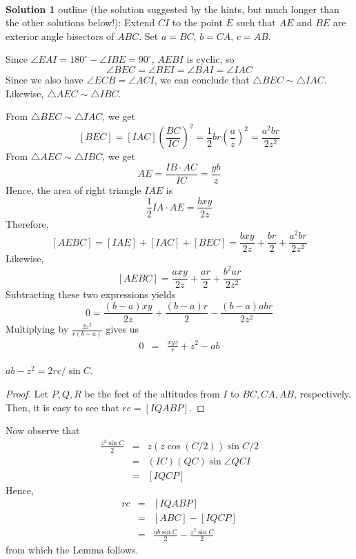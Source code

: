 \begin{mdsoln}
    \ \\
    \textbf{Solution 1} outline (the solution suggested by the hints, but much longer than the other solutions below!):
Extend $CI$ to the point $E$ such that $AE$ and $BE$ are exterior angle bisectors of $ABC$. Set $a = BC$, $b = CA$, $c = AB$.

Since $\angle EAI = 180^\circ - \angle IBE = 90^\circ$, $AEBI$ is cyclic, so
\[
\angle BEC = \angle BEI = \angle BAI = \angle IAC
\]Since we also have $\angle ECB = \angle ACI$, we can conclude that $\triangle BEC\sim \triangle IAC$. Likewise, $\triangle AEC\sim \triangle IBC$.

From $\triangle BEC\sim \triangle IAC$, we get
\[
[BEC] = [IAC]\left(\frac {BC}{IC}\right)^2 = \frac {1}{2}br\left(\frac {a}{z}\right)^2 = \frac {a^2br}{2z^2}
\]From $\triangle AEC\sim \triangle IBC$, we get
\[
AE = \frac {IB\cdot AC}{IC} = \frac {yb}{z}
\]Hence, the area of right triangle $IAE$ is
\[
\frac {1}{2}IA\cdot AE = \frac {bxy}{2z}
\]Therefore,
\[
[AEBC] = [IAE] + [IAC] + [BEC] = \frac {bxy}{2z} + \frac {br}{2} + \frac {a^2br}{2z^2}
\]Likewise,
\[
[AEBC] = \frac {axy}{2z} + \frac {ar}{2} + \frac {b^2ar}{2z^2}
\]Subtracting these two expressions yields
\[
0 = \frac {(b - a)xy}{2z} + \frac {(b - a)r}{2} - \frac {(b - a)abr}{2z^2}
\]Multiplying by $\frac {2z^2}{r(b - a)}$ gives us
\begin{eqnarray}0 & = & \frac {xyz}{r} + z^2 - ab\end{eqnarray}

\begin{lemma}
    $ab - z^2 = 2rc/\sin C$.
\end{lemma}
\begin{proof}
    Let $P,Q,R$ be the feet of the altitudes from $I$ to $BC,CA,AB$, respectively. Then, it is easy to see that $rc = [IQABP]$.
\end{proof} 

Now observe that
\begin{eqnarray*}\frac {z^2\sin C}{2} & = & z(z\cos (C/2))\sin C/2 \\
& = & (IC)(QC)\sin \angle QCI \\
& = & [IQCP]\end{eqnarray*}Hence,
\begin{eqnarray*}rc & = & [IQABP] \\
& = & [ABC] - [IQCP] \\
& = & \frac {ab\sin C}{2} - \frac {z^2\sin C}{2}\end{eqnarray*}from which the Lemma follows.
\vspace{6pt}


\end{mdsoln}
